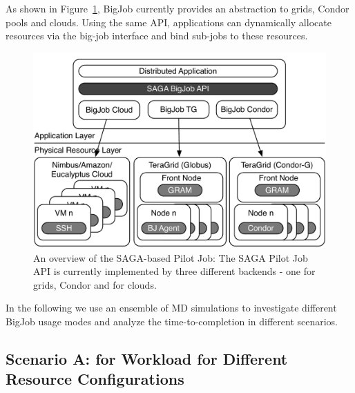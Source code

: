 \documentclass[graybox]{svmult}
\begin{document}
As shown in Figure~\ref{fig:figures_distributed_pilot_job}, BigJob currently
provides an abstraction to grids, Condor pools and
clouds. Using the same API, applications can dynamically allocate
resources via the big-job interface and bind sub-jobs to these
resources. 

\begin{figure}[htbp]
    \centering
    \includegraphics[width=1.0\textwidth]{figures/distributed_pilot_job.pdf}
    \caption{
      \footnotesize
      \label{fig:figures_distributed_pilot_job}
      An overview of the SAGA-based Pilot Job:     The SAGA Pilot Job API 
      is currently implemented by three different backends - one for grids,
      Condor and for clouds.}
\end{figure}

In the following we use an ensemble of MD simulations to investigate different 
BigJob usage modes and analyze the time-to-completion \tc in different scenarios.


\subsection{Scenario A: \tc for Workload for Different Resource
  Configurations\\}

 
\end{document}
